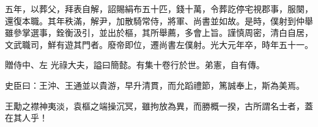 \begin{pinyinscope}
 五年，以葬父，拜表自解，詔賜絹布五十匹，錢十萬，令葬訖停宅視郡事，服闋，還復本職。其年秩滿，解尹，加散騎常侍，將軍、尚書並如故。是時，僕射到仲舉雖參掌選事，銓衡汲引，並出於樞，其所舉薦，多會上旨。謹慎周密，清白自居，文武職司，鮮有遊其門者。廢帝即位，遷尚書左僕射。光大元年卒，時年五十一。



 贈侍中、左
 光祿大夫，謚曰簡懿。有集十卷行於世。弟憲，自有傳。



 史臣曰：王沖、王通並以貴游，早升清貫，而允蹈禮節，篤誠奉上，斯為美焉。



 王勱之襟神夷淡，袁樞之端操沉冥，雖拘放為異，而勝概一揆，古所謂名士者，蓋在其人乎！






\end{pinyinscope}
